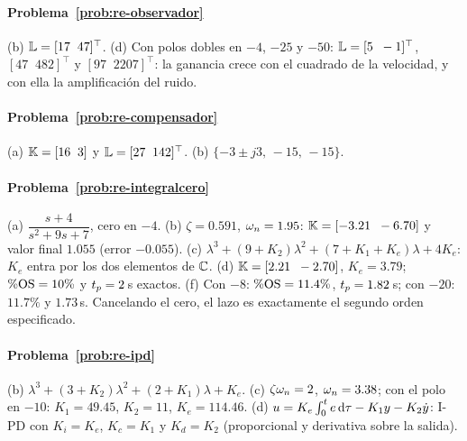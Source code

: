 \paragraph{Problema~\ref{prob:re-observador}}
(b) $\mathbb{L}=[17\;\;47]^\top$. (d) Con polos dobles en $-4$, $-25$ y $-50$: $\mathbb{L}=[5\;\;-1]^\top$, $[47\;\;482]^\top$ y $[97\;\;2207]^\top$: la ganancia crece con el cuadrado de la velocidad, y con ella la amplificación del ruido.

\paragraph{Problema~\ref{prob:re-compensador}}
(a) $\mathbb{K}=[16\;\;3]$ y $\mathbb{L}=[27\;\;142]^\top$. (b) $\{-3\pm j3,\,-15,\,-15\}$.

\paragraph{Problema~\ref{prob:re-integralcero}}
(a) $\dfrac{s+4}{s^2+9s+7}$, cero en $-4$. (b) $\zeta=0.591$, $\omega_n=1.95$: $\mathbb{K}=[-3.21\;\;-6.70]$ y valor final $1.055$ (error $-0.055$). (c) $\lambda^3+(9+K_2)\lambda^2+(7+K_1+K_e)\lambda+4K_e$: $K_e$ entra por los dos elementos de $\mathbb{C}$. (d) $\mathbb{K}=[2.21\;\;-2.70]$, $K_e=3.79$; $\%\mathrm{OS}=10\%$ y $t_p=2$\,s exactos. (f) Con $-8$: $\%\mathrm{OS}=11.4\%$, $t_p=1.82$\,s; con $-20$: $11.7\%$ y $1.73$\,s. Cancelando el cero, el lazo es exactamente el segundo orden especificado.

\paragraph{Problema~\ref{prob:re-ipd}}
(b) $\lambda^3+(3+K_2)\lambda^2+(2+K_1)\lambda+K_e$. (c) $\zeta\omega_n=2$, $\omega_n=3.38$; con el polo en $-10$: $K_1=49.45$, $K_2=11$, $K_e=114.46$. (d) $u=K_e\int_0^t e\,\mathrm{d}\tau-K_1y-K_2\dot y$: I-PD con $K_i=K_e$, $K_c=K_1$ y $K_d=K_2$ (proporcional y derivativa sobre la salida).

\respuestaspausas
